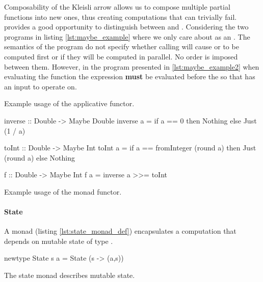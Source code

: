 Composability of the Kleisli arrow allows us to compose multiple
partial functions into new ones, thus creating computations that can
trivially fail.  provides a good opportunity to
distinguish between  and . Considering
the two programs in listing \ref{lst:maybe_example} where we only care
about  as an . The semantics of the
program do not specify whether calling  will cause
 or  to be computed first or if they
will be computed in parallel. No order is imposed between
them. However, in the program presented in \ref{lst:maybe_example2}
when evaluating the function  the expression 
\textbf{must} be evaluated before the  so that
 has an input to operate on.

\begin{code}
\label{lst:maybe_example}
\caption{Example usage of the  applicative functor.}
\end{code}

\begin{code}
\begin{haskellcode}
inverse :: Double -> Maybe Double
inverse a = if a == 0 then Nothing else Just (1 / a)

toInt :: Double -> Maybe Int
toInt a =
  if a == fromInteger (round a)
    then Just (round a)
    else Nothing

f :: Double -> Maybe Int
f a = inverse a >>= toInt
\end{haskellcode}
\caption{\label{lst:maybe_example2}Example usage of the  monad functor.}
\end{code}

\paragraph{State}

A  monad (listing \ref{lst:state_monad_def}) encapsulates
a computation that depends on mutable state of type .

\begin{code}
\begin{haskellcode}
newtype State s a = State (s -> (a,s))
\end{haskellcode}
\label{lst:state_monad_def}
\caption{The state monad describes mutable state.}
\end{code}

